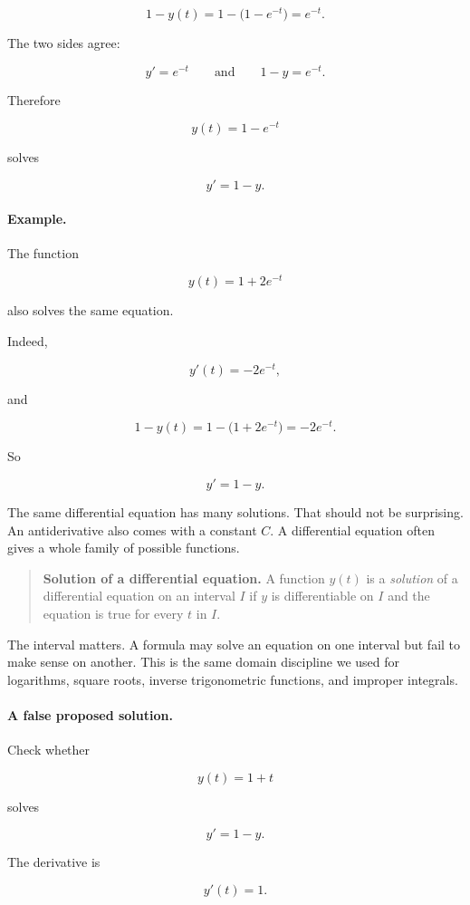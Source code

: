 \[
1-y(t)=1-\bigl(1-e^{-t}\bigr)=e^{-t}.
\]

The two sides agree:

\[
y'=e^{-t}
\qquad\text{and}\qquad
1-y=e^{-t}.
\]

Therefore

\[
\boxed{
y(t)=1-e^{-t}
}
\]

solves

\[
y'=1-y.
\]

\paragraph{Example.}
The function

\[
y(t)=1+2e^{-t}
\]

also solves the same equation.

Indeed,

\[
y'(t)=-2e^{-t},
\]

and

\[
1-y(t)=1-\bigl(1+2e^{-t}\bigr)=-2e^{-t}.
\]

So

\[
y'=1-y.
\]

The same differential equation has many solutions.  That should not be surprising.
An antiderivative also comes with a constant \(C\).  A differential equation often gives
a whole family of possible functions.

\begin{quote}
\textbf{Solution of a differential equation.}
A function \(y(t)\) is a \emph{solution} of a differential equation on an interval \(I\)
if \(y\) is differentiable on \(I\) and the equation is true for every \(t\) in \(I\).
\end{quote}

The interval matters.  A formula may solve an equation on one interval but fail to make
sense on another.  This is the same domain discipline we used for logarithms, square
roots, inverse trigonometric functions, and improper integrals.

\paragraph{A false proposed solution.}
Check whether

\[
y(t)=1+t
\]

solves

\[
y'=1-y.
\]

The derivative is

\[
y'(t)=1.
\]


